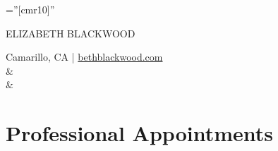 \documentclass[a4paper,10pt]{article}
\begin{document}

\pagestyle{empty} %

\font\fb=''[cmr10]'' %

\par{\centering
		{\Huge ELIZABETH BLACKWOOD
	}\par}

\begin{center}
    \textsc{}Camarillo, CA | \href{http://bethblackwood.com/}{bethblackwood.com}\\ 
    &\\
    &\\
\end{center}

\section{Professional Appointments}
\end{document}
